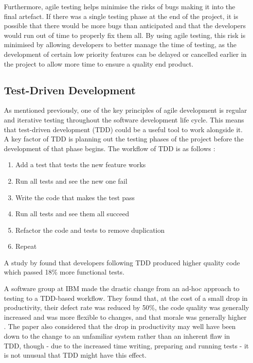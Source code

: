 Furthermore, agile testing helps minimise the risks of bugs making it into the final artefact. 
If there was a single testing phase at the end of the project, it is possible that there would be more bugs than anticipated and that the developers would run out of time to properly fix them all. 
By using agile testing, this risk is minimised by allowing developers to better manage the time of testing, as the development of certain low priority features can be delayed or cancelled earlier in the project to allow more time to ensure a quality end product.

\subsection{Test-Driven Development}
As mentioned previously, one of the key principles of agile development is regular and iterative testing throughout the software development life cycle.
This means that test-driven development (TDD) could be a useful tool to work alongside it.
A key factor of TDD is planning out the testing phases of the project before the development of that phase begins.
The workflow of TDD is as follows \citep{Beck:2002:TDD:579193}:
\begin{enumerate}
	\item Add a test that tests the new feature works
	\item Run all tests and see the new one fail
	\item Write the code that makes the test pass
	\item Run all tests and see them all succeed
	\item Refactor the code and tests to remove duplication
	\item Repeat
\end{enumerate}

A study by \cite{George:2003:IIT:952532.952753} found that developers following TDD produced higher quality code which passed 18\% more functional tests.

A software group at IBM made the drastic change from an ad-hoc approach to testing to a TDD-based workflow. They found that, at the cost of a small drop in productivity, their defect rate was reduced by 50\%, the code quality was generally increased and was more flexible to changes, and that morale was generally higher \citep{IBMTDD}. 
The paper also considered that the drop in productivity may well have been down to the change to an unfamiliar system rather than an inherent flaw in TDD, though - due to the increased time writing, preparing and running tests - it is not unusual that TDD might have this effect.